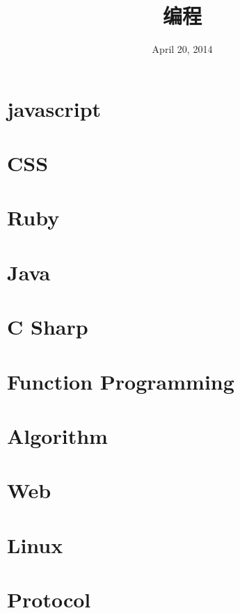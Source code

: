 \documentclass[12pt, oneside, b5paper]{book}
\title{编程}
\date{April 20, 2014}
\begin{document}
  
\maketitle

\part{javascript}


%










\part{CSS}


\part{Ruby}  


\part{Java}










\part{C Sharp}


\part{Function Programming}


\part{Algorithm}


\part{Web}


\part{Linux}



\part{Protocol}


		
\newpage
\end{document}

